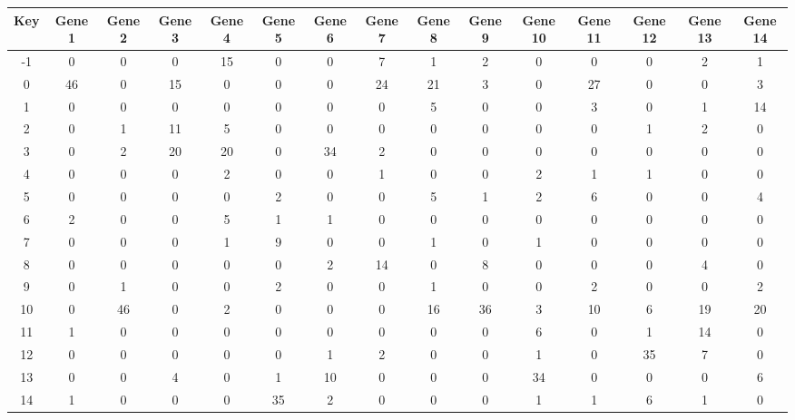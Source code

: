 \begin{tabular}{|c|c|c|c|c|c|c|c|c|c|c|c|c|c|c|}
\hline
Key & Gene 1 & Gene 2 & Gene 3 & Gene 4 & Gene 5 & Gene 6 & Gene 7 & Gene 8 & Gene 9 & Gene 10 & Gene 11 & Gene 12 & Gene 13 & Gene 14 \\
\hline
-1 & 0 & 0 & 0 & 15 & 0 & 0 & 7 & 1 & 2 & 0 & 0 & 0 & 2 & 1 \\
0 & 46 & 0 & 15 & 0 & 0 & 0 & 24 & 21 & 3 & 0 & 27 & 0 & 0 & 3 \\
1 & 0 & 0 & 0 & 0 & 0 & 0 & 0 & 5 & 0 & 0 & 3 & 0 & 1 & 14 \\
2 & 0 & 1 & 11 & 5 & 0 & 0 & 0 & 0 & 0 & 0 & 0 & 1 & 2 & 0 \\
3 & 0 & 2 & 20 & 20 & 0 & 34 & 2 & 0 & 0 & 0 & 0 & 0 & 0 & 0 \\
4 & 0 & 0 & 0 & 2 & 0 & 0 & 1 & 0 & 0 & 2 & 1 & 1 & 0 & 0 \\
5 & 0 & 0 & 0 & 0 & 2 & 0 & 0 & 5 & 1 & 2 & 6 & 0 & 0 & 4 \\
6 & 2 & 0 & 0 & 5 & 1 & 1 & 0 & 0 & 0 & 0 & 0 & 0 & 0 & 0 \\
7 & 0 & 0 & 0 & 1 & 9 & 0 & 0 & 1 & 0 & 1 & 0 & 0 & 0 & 0 \\
8 & 0 & 0 & 0 & 0 & 0 & 2 & 14 & 0 & 8 & 0 & 0 & 0 & 4 & 0 \\
9 & 0 & 1 & 0 & 0 & 2 & 0 & 0 & 1 & 0 & 0 & 2 & 0 & 0 & 2 \\
10 & 0 & 46 & 0 & 2 & 0 & 0 & 0 & 16 & 36 & 3 & 10 & 6 & 19 & 20 \\
11 & 1 & 0 & 0 & 0 & 0 & 0 & 0 & 0 & 0 & 6 & 0 & 1 & 14 & 0 \\
12 & 0 & 0 & 0 & 0 & 0 & 1 & 2 & 0 & 0 & 1 & 0 & 35 & 7 & 0 \\
13 & 0 & 0 & 4 & 0 & 1 & 10 & 0 & 0 & 0 & 34 & 0 & 0 & 0 & 6 \\
14 & 1 & 0 & 0 & 0 & 35 & 2 & 0 & 0 & 0 & 1 & 1 & 6 & 1 & 0 \\
\hline
\end{tabular}